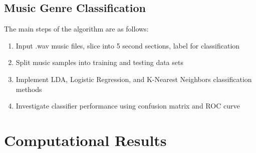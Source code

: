 \documentclass{article}
\begin{document}
\subsection{Music Genre Classification}
The main steps of the algorithm are as follows: 
\begin{enumerate}
    \item Input .wav music files, slice into 5 second sections, label for classification
    \item Split music samples into training and testing data sets
    \item Implement LDA, Logistic Regression, and K-Nearest Neighbors classification methods
    \item Investigate classifier performance using confusion matrix and ROC curve
\end{enumerate}

\section{Computational Results}
\end{document}
